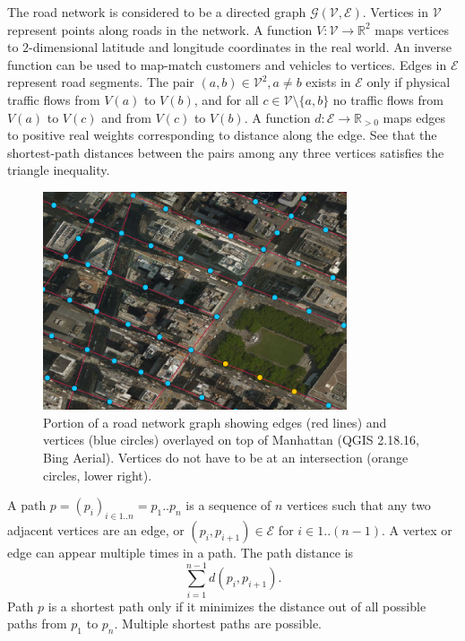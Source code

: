 The road network is considered to be a directed graph $\mathcal{G}(\mathcal{V},\mathcal{E})$.
Vertices in $\mathcal{V}$ represent points along roads in the network.
A function ${V:\mathcal{V}\rightarrow \mathbb{R}^2}$ maps vertices to
$2$-dimensional latitude and longitude coordinates in the real world.
An inverse function can be used to map-match customers and vehicles to vertices.
Edges in $\mathcal{E}$ represent road segments. The pair $(a,b)\in
\mathcal{V}^2, a\neq b$ exists in $\mathcal{E}$ only if physical traffic flows from
$V(a)$ to $V(b)$, and for all $c\in \mathcal{V}\setminus\{a,b\}$ no traffic flows from
$V(a)$ to $V(c)$ and from $V(c)$ to $V(b)$.
A function ${d:\mathcal{E}\rightarrow\mathbb{R}_{>0}}$ maps edges to positive real weights
corresponding to distance along the edge. See that the
shortest-path distances between the pairs among any three vertices satisfies the
triangle inequality.

\begin{figure}[h]
\centering
\includegraphics[width=0.8\textwidth]{fig/road}
\caption{Portion of a road network graph showing edges (red lines) and vertices
(blue circles) overlayed on top of Manhattan (QGIS 2.18.16, Bing Aerial).
Vertices do not have to be at an intersection (orange circles, lower right).}
\label{fig:road}
\end{figure}

A path $p=(p_i)_{i\in 1..n}=p_1..p_n$ is a sequence of $n$ vertices
such that any two adjacent vertices are an edge, or $(p_i,p_{i+1})\in \mathcal{E}$ for
$i\in 1..(n-1)$.
A vertex or edge can appear multiple times in a path.
The path distance is
$$\sum_{i=1}^{n-1} d(p_i, p_{i+1}).$$
Path $p$ is a shortest path only if it minimizes the distance out of all
possible paths from $p_1$ to $p_n$.
Multiple shortest paths are possible.

